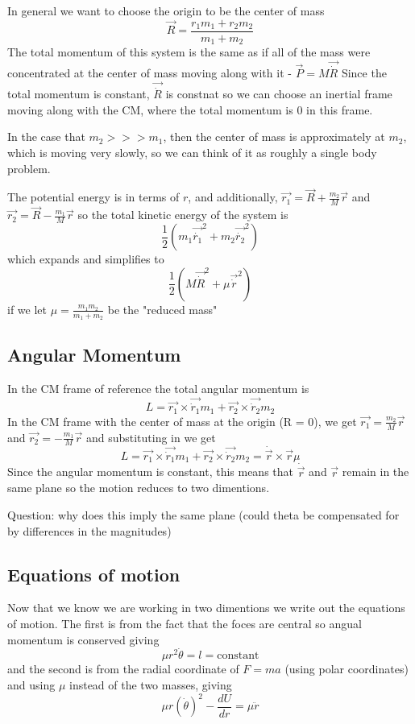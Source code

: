 \documentclass{homework}
\begin{document}
In general we want to choose the origin to be the center of mass
\[\vec{R} = \frac{r_1m_1 + r_2m_2}{m_1 + m_2}\]
The total momentum of this system is the same as if all of the mass were concentrated at the center of mass moving along with it - $\vec{P} = M\vec{\dot R}$ Since the total momentum is constant, $\vec{\dot R}$ is constnat so we can choose an inertial frame moving along with the CM, where the total momentum is $0$ in this frame.

In the case that $m_2 >>> m_1$, then the center of mass is approximately at $m_2$, which is moving very slowly, so we can think of it as roughly a single body problem.

The potential energy is in terms of $r$, and additionally, $\vec{r_1} = \vec{R} +\frac{m_2}{M}\vec{r}$ and $\vec{r_2} = \vec{R} -\frac{m_1}{M}\vec{r}$ so the total kinetic energy of the system is 
\[\frac{1}{2}(m_1\vec{\dot{r_1}}^2 + m_2\vec{\dot{r_2}}^2)\]
which expands and simplifies to 
\[\frac{1}{2}(M\vec{\dot{R}}^2 + \mu \vec{\dot{r}}^2)\]
if we let $\mu = \frac{m_1m_2}{m_1 + m_2}$ be the "reduced mass"

\subsection{Angular Momentum}

In the CM frame of reference the total angular momentum is
\[L = \vec{r_1}\times\vec{\dot{r}_1}m_1 + \vec{r_2}\times\vec{\dot{r}_2}m_2\]
In the CM frame with the center of mass at the origin (R = 0), we get $\vec{r_1} =\frac{m_2}{M}\vec{r}$ and $\vec{r_2} = -\frac{m_1}{M}\vec{r}$ and substituting in we get
\[L = \vec{r_1}\times\vec{\dot{r}_1}m_1 + \vec{r_2}\times\vec{\dot{r}_2}m_2 = \dot{\vec{r}} \times \vec{r} \mu\]
Since the angular momentum is constant, this means that $\dot{\vec{r}} $ and $ \vec{r}$ remain in the same plane so the motion reduces to two dimentions.

Question: why does this imply the same plane (could theta be compensated for by differences in the magnitudes)


\subsection{Equations of motion}

Now that we know we are working in two dimentions we write out the equations of motion. The first is from the fact that the foces are central so angual momentum is conserved giving
\[\mu r^2\dot{\theta} = l = \text{constant}\]
and the second is from the radial coordinate of $F  = ma$ (using polar coordinates) and using $\mu$ instead of the two masses, giving
\[\mu r(\dot{\theta})^2 - \frac{dU}{dr} = \mu\ddot{r}\]
\end{document}
